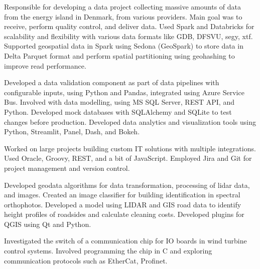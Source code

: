 Responsible for developing a data project collecting massive amounts of data from the energy island in Denmark, from various providers.
 Main goal was to receive, perform quality control, and deliver data.
 Used Spark and Databricks for scalability and flexibility with various data formats like GDB, DFSVU, segy, xtf.
 Supported geospatial data in Spark using Sedona (GeoSpark) to store data in Delta Parquet format and perform spatial partitioning using geohashing to improve read performance.

    
\divider

Developed a data validation component as part of data pipelines with configurable inputs, using Python and Pandas, integrated using Azure Service Bus.
 Involved with data modelling, using MS SQL Server, REST API, and Python.
 Developed mock databases with SQLAlchemy and SQLite to test changes before production.
 Developed data analytics and visualization tools using Python, Streamlit, Panel, Dash, and Bokeh.

             
\divider

Worked on large projects building custom IT solutions with multiple integrations.
 Used Oracle, Groovy, REST, and a bit of JavaScript.
 Employed Jira and Git for project management and version control.

      
\divider

Developed geodata algorithms for data transformation, processing of lidar data, and images.
 Created an image classifier for building identification in spectral orthophotos.
 Developed a model using LIDAR and GIS road data to identify height profiles of roadsides and calculate cleaning costs.
 Developed plugins for QGIS using Qt and Python.

     
\divider

Investigated the switch of a communication chip for IO boards in wind turbine control systems.
 Involved programming the chip in C and exploring communication protocols such as EtherCat, Profinet.

  
\divider

